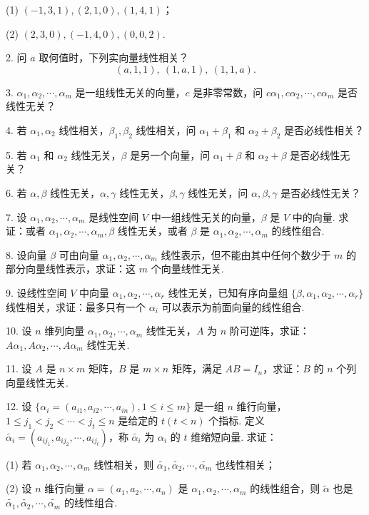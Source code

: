 \documentclass[UTF8,12pt,a4paper,fontset=fandol]{ctexart}
\begin{document}
(1) $(-1,3,1),(2,1,0),(1,4,1)$；

(2) $(2,3,0),(-1,4,0),(0,0,2)$.

2. 问 $a$ 取何值时，下列实向量线性相关？
\[
(a,1,1),\ (1,a,1),\ (1,1,a).
\]

3. $\alpha_1,\alpha_2,\cdots,\alpha_m$ 是一组线性无关的向量，$c$ 是非零常数，问 $c\alpha_1,c\alpha_2,\cdots,c\alpha_m$ 是否线性无关？

4. 若 $\alpha_1,\alpha_2$ 线性相关，$\beta_1,\beta_2$ 线性相关，问 $\alpha_1+\beta_1$ 和 $\alpha_2+\beta_2$ 是否必线性相关？

5. 若 $\alpha_1$ 和 $\alpha_2$ 线性无关，$\beta$ 是另一个向量，问 $\alpha_1+\beta$ 和 $\alpha_2+\beta$ 是否必线性无关？

6. 若 $\alpha,\beta$ 线性无关，$\alpha,\gamma$ 线性无关，$\beta,\gamma$ 线性无关，问 $\alpha,\beta,\gamma$ 是否必线性无关？

7. 设 $\alpha_1,\alpha_2,\cdots,\alpha_m$ 是线性空间 $V$ 中一组线性无关的向量，$\beta$ 是 $V$ 中的向量. 求证：或者 $\alpha_1,\alpha_2,\cdots,\alpha_m,\beta$ 线性无关，或者 $\beta$ 是 $\alpha_1,\alpha_2,\cdots,\alpha_m$ 的线性组合.

8. 设向量 $\beta$ 可由向量 $\alpha_1,\alpha_2,\cdots,\alpha_m$ 线性表示，但不能由其中任何个数少于 $m$ 的部分向量线性表示，求证：这 $m$ 个向量线性无关.

9. 设线性空间 $V$ 中向量 $\alpha_1,\alpha_2,\cdots,\alpha_r$ 线性无关，已知有序向量组 $\{\beta,\alpha_1,\alpha_2,\cdots,\alpha_r\}$ 线性相关，求证：最多只有一个 $\alpha_i$ 可以表示为前面向量的线性组合.

10. 设 $n$ 维列向量 $\alpha_1,\alpha_2,\cdots,\alpha_m$ 线性无关，$A$ 为 $n$ 阶可逆阵，求证：$A\alpha_1,A\alpha_2,\cdots,A\alpha_m$ 线性无关.

11. 设 $A$ 是 $n\times m$ 矩阵，$B$ 是 $m\times n$ 矩阵，满足 $AB=I_n$，求证：$B$ 的 $n$ 个列向量线性无关.

12. 设 $\{\alpha_i=(a_{i1},a_{i2},\cdots,a_{in}),1\leq i\leq m\}$ 是一组 $n$ 维行向量，$1\leq j_1<j_2<\cdots<j_t\leq n$ 是给定的 $t(t<n)$ 个指标. 定义 $\widetilde{\alpha_i}=(a_{ij_1},a_{ij_2},\cdots,a_{ij_t})$，称 $\widetilde{\alpha_i}$ 为 $\alpha_i$ 的 $t$ 维缩短向量. 求证：

(1) 若 $\alpha_1,\alpha_2,\cdots,\alpha_m$ 线性相关，则 $\widetilde{\alpha_1},\widetilde{\alpha_2},\cdots,\widetilde{\alpha_m}$ 也线性相关；

(2) 设 $n$ 维行向量 $\alpha=(a_1,a_2,\cdots,a_n)$ 是 $\alpha_1,\alpha_2,\cdots,\alpha_m$ 的线性组合，则 $\widetilde{\alpha}$ 也是 $\widetilde{\alpha_1},\widetilde{\alpha_2},\cdots,\widetilde{\alpha_m}$ 的线性组合.
\end{document}
